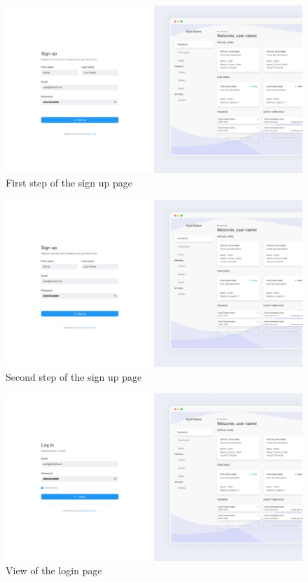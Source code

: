 \documentclass[a4paper, 12pt, oneside]{book}
\begin{document}
\begin{figure}[H]
	\centering
	\includegraphics[width=\textwidth]{assets/ui/SignUpStepOne.png}
	\caption{First step of the sign up page}
\end{figure}
\begin{figure}[H]
	\centering
	\includegraphics[width=\textwidth]{assets/ui/SignUpStepOne.png}
	\caption{Second step of the sign up page}
\end{figure}
\begin{figure}[H]
	\centering
	\includegraphics[width=\textwidth]{assets/ui/LogIn.png}
	\caption{View of the login page}
\end{figure}
\end{document}
